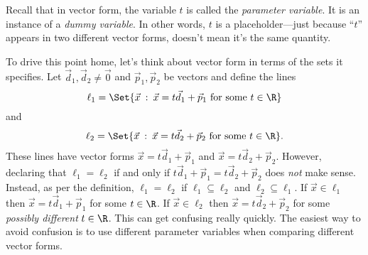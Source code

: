 Recall that in vector form, the variable $t$ is called the \emph{parameter variable}.  It is an instance of
a \emph{dummy variable}. In other words, $t$ is a placeholder---just because ``$t$'' appears in two different vector
forms, doesn't mean it's the same quantity.

To drive this point home, let's think about vector form in terms
of the sets it specifies. Let $\vec d_1,\vec d_2\neq\vec 0$ and $\vec p_1,\vec p_2$ be vectors and define the lines
\[
	\ell_1=\Set{\vec x\given \vec x=t\vec d_1+\vec p_1\text{ for some }t\in\R}
\]
and
\[
	\ell_2=\Set{\vec x\given \vec x=t\vec d_2+\vec p_2\text{ for some }t\in\R}.
\]
These lines have vector forms $\vec x=t\vec d_1+\vec p_1$ and $\vec x=t\vec d_2+\vec p_2$.
However, declaring that $\ell_1=\ell_2$ if and only if $t\vec d_1+\vec p_1=t\vec d_2+\vec p_2$
does \emph{not} make sense.   Instead, as per the definition, $\ell_1=\ell_2$ if $\ell_1\subseteq\ell_2$ and $\ell_2\subseteq\ell_1$.
If $\vec x\in\ell_1$ then $\vec x=t\vec d_1+\vec p_1$ for some $t\in\R$.  If $\vec x\in\ell_2$
then $\vec x=t\vec d_2+\vec p_2$ for some \emph{possibly different} $t\in \R$.  This can get
confusing really quickly.  The easiest way to avoid confusion is to use different parameter variables 
when comparing different vector forms.

